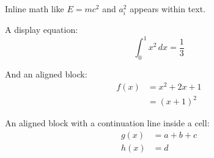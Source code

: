 Inline math like $E = mc^2$ and $a_i^2$ appears within text.

A display equation:
\[
  \int_0^1 x^2 \, dx = \frac{1}{3}
\]

And an aligned block:
\begin{align}
  f(x) &= x^2 + 2x + 1 \\
       &= (x + 1)^2
\end{align}

An aligned block with a continuation line inside a cell:
\begin{align}
  g(x) &= a + b
          + c \\
  h(x) &= d
\end{align}
